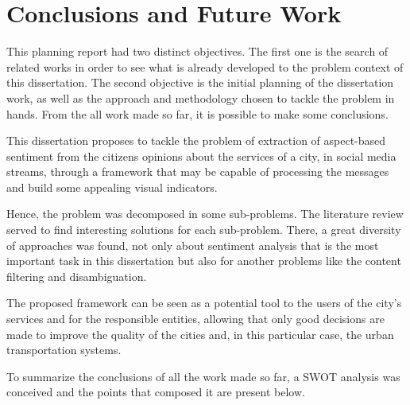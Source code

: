 \chapter{Conclusions and Future Work} \label{chap:conclusions}

\minitoc \mtcskip \noindent

This planning report had two distinct objectives. The first one is the search of related works in order to see what is already developed to the problem context of this dissertation. The second objective is the initial planning of the dissertation work, as well as the approach and methodology chosen to tackle the problem in hands. From the all work made so far, it is possible to make some conclusions.

This dissertation proposes to tackle the problem of extraction of aspect-based sentiment from the citizens opinions about the services of a city, in social media streams, through a framework that may be capable of processing the messages and build some appealing visual indicators.

Hence, the problem was decomposed in some sub-problems. The literature review served to find interesting solutions for each sub-problem. There, a great diversity of approaches was found, not only about sentiment analysis that is the most important task in this dissertation but also for another problems like the content filtering and disambiguation.

The proposed framework can be seen as a potential tool to the users of the city's services and for the responsible entities, allowing that only good decisions are made to improve the quality of the cities and, in this particular case, the urban transportation systems. 

To summarize the conclusions of all the work made so far, a SWOT analysis was conceived and the points that composed it are present below.

